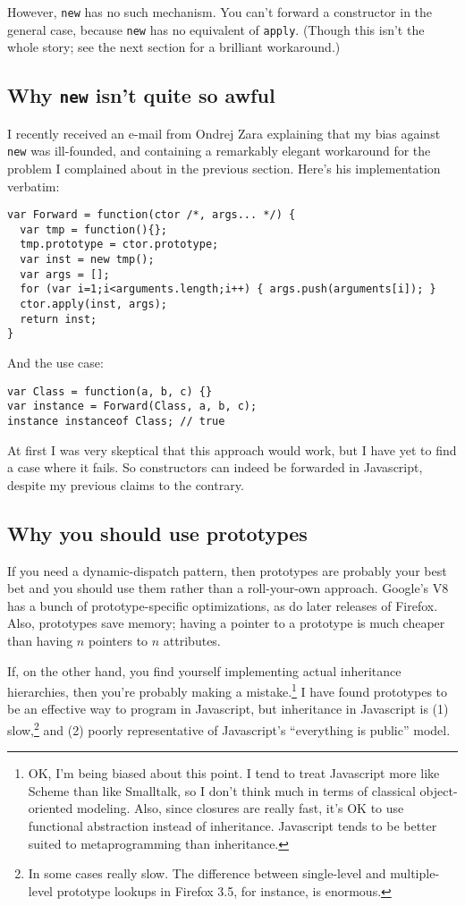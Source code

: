 \documentclass{article}
\begin{document}
    However, {\tt new} has no such mechanism. You can't forward a constructor in the general case, because {\tt new} has no equivalent of {\tt apply}. (Though this isn't the whole story; see
    the next section for a brilliant workaround.)

\subsection {Why {\tt new} isn't quite so awful}
    I recently received an e-mail from Ondrej Zara explaining that my bias against {\tt new} was ill-founded, and containing a remarkably elegant workaround for the problem I complained about
    in the previous section. Here's his implementation verbatim:

\begin{verbatim}
var Forward = function(ctor /*, args... */) {
  var tmp = function(){};
  tmp.prototype = ctor.prototype;
  var inst = new tmp();
  var args = [];
  for (var i=1;i<arguments.length;i++) { args.push(arguments[i]); }
  ctor.apply(inst, args);
  return inst;
}
\end{verbatim}

    \noindent And the use case:

\begin{verbatim}
var Class = function(a, b, c) {}
var instance = Forward(Class, a, b, c);
instance instanceof Class; // true
\end{verbatim}

    At first I was very skeptical that this approach would work, but I have yet to find a case where it fails. So constructors can indeed be forwarded in Javascript, despite my previous claims
    to the contrary.

\subsection {Why you should use prototypes}
    If you need a dynamic-dispatch pattern, then prototypes are probably your best bet and you should use them rather than a roll-your-own approach. Google's V8 has a bunch of
    prototype-specific optimizations, as do later releases of Firefox. Also, prototypes save memory; having a pointer to a prototype is much cheaper than having $n$ pointers to $n$ attributes.

    If, on the other hand, you find yourself implementing actual inheritance hierarchies, then you're probably making a mistake.\footnote{OK, I'm being biased about this point. I tend to treat
    Javascript more like Scheme than like Smalltalk, so I don't think much in terms of classical object-oriented modeling. Also, since closures are really fast, it's OK to use functional
    abstraction instead of inheritance. Javascript tends to be better suited to metaprogramming than inheritance.} I have found prototypes to be an effective way to program in Javascript, but
    inheritance in Javascript is (1) slow,\footnote{In some cases really slow. The difference between single-level and multiple-level prototype lookups in Firefox 3.5, for instance, is
    enormous.} and (2) poorly representative of Javascript's ``everything is public'' model.
\end{document}
